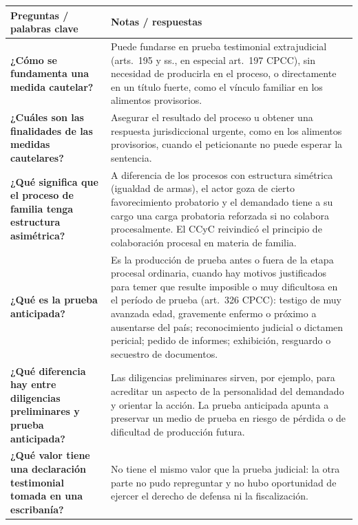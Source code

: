 \documentclass[12pt,oneside]{book}
\begin{document}
\begin{longtable}{@{}>{\raggedright\arraybackslash}p{}>{\raggedright\arraybackslash}p{}@{}}
\toprule
\textbf{Preguntas / palabras clave} & \textbf{Notas / respuestas} \\
\midrule
\endhead

\textbf{¿Cómo se fundamenta una medida cautelar?} &
Puede fundarse en prueba testimonial extrajudicial (arts.\ 195 y ss., en especial art.\ 197 CPCC), sin necesidad de producirla en el proceso, o directamente en un título fuerte, como el vínculo familiar en los alimentos provisorios. \\[0.6em]

\textbf{¿Cuáles son las finalidades de las medidas cautelares?} &
Asegurar el resultado del proceso u obtener una respuesta jurisdiccional urgente, como en los alimentos provisorios, cuando el peticionante no puede esperar la sentencia. \\[0.6em]

\textbf{¿Qué significa que el proceso de familia tenga estructura asimétrica?} &
A diferencia de los procesos con estructura simétrica (igualdad de armas), el actor goza de cierto favorecimiento probatorio y el demandado tiene a su cargo una carga probatoria reforzada si no colabora procesalmente. El CCyC reivindicó el principio de colaboración procesal en materia de familia. \\[0.6em]

\textbf{¿Qué es la prueba anticipada?} &
Es la producción de prueba antes o fuera de la etapa procesal ordinaria, cuando hay motivos justificados para temer que resulte imposible o muy dificultosa en el período de prueba (art.\ 326 CPCC): testigo de muy avanzada edad, gravemente enfermo o próximo a ausentarse del país; reconocimiento judicial o dictamen pericial; pedido de informes; exhibición, resguardo o secuestro de documentos. \\[0.6em]

\textbf{¿Qué diferencia hay entre diligencias preliminares y prueba anticipada?} &
Las diligencias preliminares sirven, por ejemplo, para acreditar un aspecto de la personalidad del demandado y orientar la acción. La prueba anticipada apunta a preservar un medio de prueba en riesgo de pérdida o de dificultad de producción futura. \\[0.6em]

\textbf{¿Qué valor tiene una declaración testimonial tomada en una escribanía?} &
No tiene el mismo valor que la prueba judicial: la otra parte no pudo repreguntar y no hubo oportunidad de ejercer el derecho de defensa ni la fiscalización. \\[0.6em]


\end{longtable}
\end{document}
